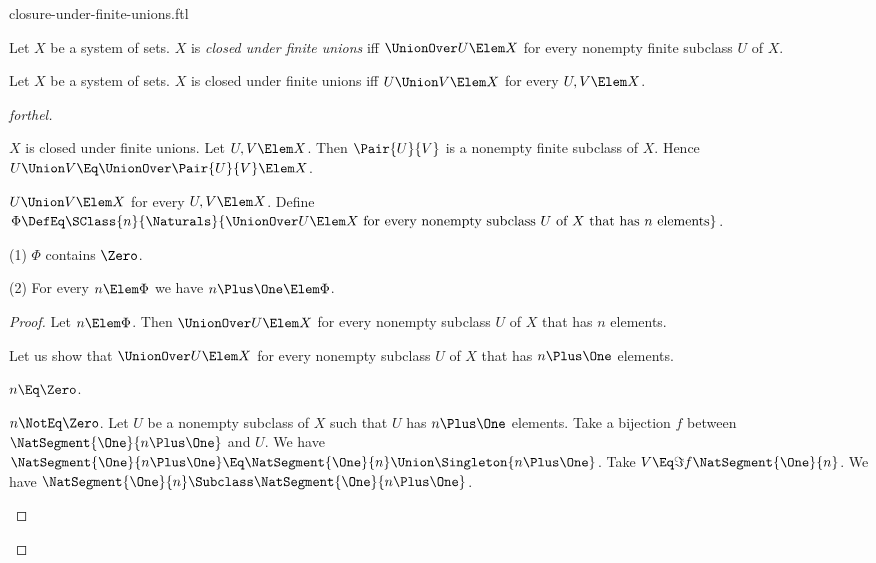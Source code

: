\documentclass{stex}
\begin{document}
\begin{smodule}{closure-under-finite-unions.ftl}



\begin{definition*}[forthel,for=closed under finite unions]
  Let $X$ be a system of sets.
  $X$ is \emph{closed under finite unions} iff $\UnionOver U \Elem X$ for every nonempty finite subclass $U$ of $X$.
\end{definition*}

\begin{proposition*}[forthel]
  Let $X$ be a system of sets.
  $X$ is closed under finite unions iff $U \Union V \Elem X$ for every $U, V \Elem X$.
\end{proposition*}
\begin{proof}[forthel]
  \begin{case}{$X$ is closed under finite unions.}
    Let $U, V \Elem X$.
    Then $\Pair{U}{V}$ is a nonempty finite subclass of $X$.
    Hence $U \Union V \Eq \UnionOver \Pair{U}{V} \Elem X$.
  \end{case}

  \begin{case}{$U \Union V \Elem X$ for every $U, V \Elem X$.}
    Define $\Phi \DefEq \SClass{n}{\Naturals}{\UnionOver U \Elem X\text{ for every nonempty subclass }U\text{ of }X\text{ that has }n\text{ elements}}$.

    (1) $\Phi$ contains $\Zero$.

    (2) For every $n \Elem \Phi$ we have $n \Plus \One \Elem \Phi$.
    \begin{proof}
      Let $n \Elem \Phi$.
      Then $\UnionOver U \Elem X$ for every nonempty subclass $U$ of $X$ that has $n$ elements.

      Let us show that $\UnionOver U \Elem X$ for every nonempty subclass $U$ of $X$ that has $n \Plus \One$ elements.

        \begin{case}{$n \Eq \Zero$.} \end{case}

        \begin{case}{$n \NotEq \Zero$.}
          Let $U$ be a nonempty subclass of $X$ such that $U$ has $n \Plus \One$ elements.
          Take a bijection $f$ between $\NatSegment{\One}{n \Plus \One}$ and $U$.
          We have $\NatSegment{\One}{n \Plus \One} \Eq \NatSegment{\One}{n} \Union \Singleton{n \Plus \One}$.
          Take $V \Eq \Im{f}{\NatSegment{\One}{n}}$.
          We have $\NatSegment{\One}{n} \Subclass \NatSegment{\One}{n \Plus \One}$.


\end{case}
\end{proof}
\end{case}
\end{proof}
\end{smodule}
\end{document}
